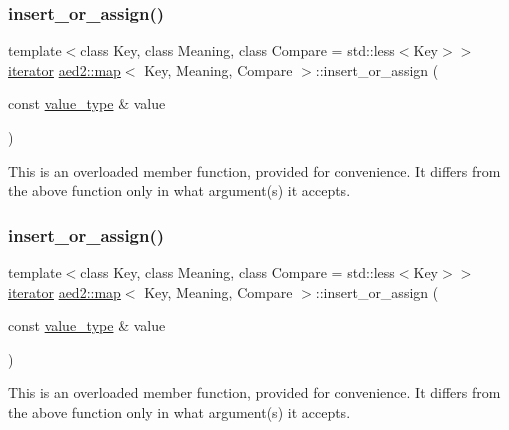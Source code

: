 \subsubsection{\texorpdfstring{insert\+\_\+or\+\_\+assign()}{insert\_or\_assign()}\hspace{0.1cm}{\footnotesize\ttfamily [3/4]}}
{\footnotesize\ttfamily template$<$class Key, class Meaning, class Compare = std\+::less$<$\+Key$>$$>$ \\
\hyperlink{classaed2_1_1map_1_1iterator}{iterator} \hyperlink{classaed2_1_1map}{aed2\+::map}$<$ Key, Meaning, Compare $>$\+::insert\+\_\+or\+\_\+assign (\begin{DoxyParamCaption}\item[{const \hyperlink{classaed2_1_1map_a719db98e0ff9a837610f76be33264680}{value\+\_\+type} \&}]{value }\end{DoxyParamCaption})\hspace{0.3cm}{\ttfamily [inline]}}

This is an overloaded member function, provided for convenience. It differs from the above function only in what argument(s) it accepts. \mbox{\label{classaed2_1_1map_a9128a806713bcc999ebd8a97ab77e765}} 
\subsubsection{\texorpdfstring{insert\+\_\+or\+\_\+assign()}{insert\_or\_assign()}\hspace{0.1cm}{\footnotesize\ttfamily [4/4]}}
{\footnotesize\ttfamily template$<$class Key, class Meaning, class Compare = std\+::less$<$\+Key$>$$>$ \\
\hyperlink{classaed2_1_1map_1_1iterator}{iterator} \hyperlink{classaed2_1_1map}{aed2\+::map}$<$ Key, Meaning, Compare $>$\+::insert\+\_\+or\+\_\+assign (\begin{DoxyParamCaption}\item[{const \hyperlink{classaed2_1_1map_a719db98e0ff9a837610f76be33264680}{value\+\_\+type} \&}]{value }\end{DoxyParamCaption})\hspace{0.3cm}{\ttfamily [inline]}}

This is an overloaded member function, provided for convenience. It differs from the above function only in what argument(s) it accepts. \mbox{\label{classaed2_1_1map_a62075a47afdf89267c5462f88164af3d}} 
